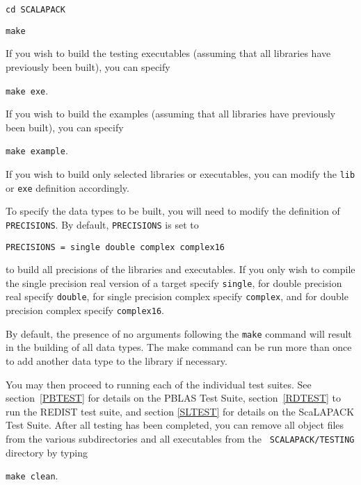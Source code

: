 \documentclass[11pt]{report}
\begin{document}
\begin{list}{}{}
\item {\tt cd SCALAPACK}
\item {\tt make}
\end{list}

If you wish to build the testing executables (assuming that all
libraries have previously been built), you can specify

\begin{list}{}{}
\item {\tt make exe}.
\end{list}

If you wish to build the examples (assuming that all
libraries have previously been built), you can specify

\begin{list}{}{}
\item {\tt make example}.
\end{list}

If you wish to build only selected libraries or executables,
you can modify the {\tt lib} or {\tt exe} definition accordingly.

To specify the data types to be built, you will need to modify
the definition of {\tt PRECISIONS}.  By default, {\tt PRECISIONS}
is set to
\begin{verbatim}
PRECISIONS = single double complex complex16
\end{verbatim}
to build all precisions of the libraries and executables.  If you only
wish to compile the single precision real version of a target specify
{\tt single}, for double precision real specify {\tt double}, for single
precision complex specify {\tt complex}, and for double precision
complex specify {\tt complex16}.

By default, the presence of
no arguments following the {\tt make} command will result in the
building of all data types.
The make command can be run more than once to add another
data type to the library if necessary.

You may then proceed to running each of the individual test suites.  See
section~\ref{PBTEST} for details on the PBLAS Test Suite,
section~\ref{RDTEST} to run the REDIST test suite, and section \ref{SLTEST}
for details on the ScaLAPACK Test Suite.  After
all testing has been completed, you can remove all object files from the
various subdirectories and all executables from the {\tt
SCALAPACK/TESTING} directory by
typing

\begin{list}{}{}
\item {\tt make clean}.
\end{list}
\end{document}
